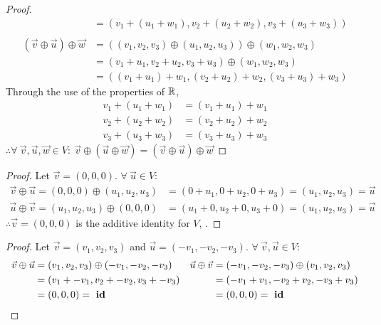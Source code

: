 \begin{enumerate}
\begin{proof}
\begin{align*}
                                              & = (v_1+(u_1+w_1),v_2+(u_2+w_2),v_3+(u_3+w_3))               \\ \\
      (\vec{v} \oplus \vec{u}) \oplus \vec{w} & = ((v_1,v_2,v_3) \oplus (u_1,u_2,u_3)) \oplus (w_1,w_2,w_3) \\
                                              & = (v_1+u_1,v_2+u_2,v_3+u_3) \oplus (w_1,w_2,w_3)            \\
                                              & = ((v_1+u_1)+w_1,(v_2+u_2)+w_2,(v_3+u_3)+w_3)
    \end{align*}
    Through the use of the properties of $\mathbb{R}$,
    \begin{align*}
      v_1+(u_1+w_1) & = (v_1+u_1)+w_1 \\
      v_2+(u_2+w_2) & = (v_2+u_2)+w_2 \\
      v_3+(u_3+w_3) & = (v_3+u_3)+w_3
    \end{align*}
    $\therefore \forall~\vec{v},\vec{u},\vec{w} \in V:~\vec{v} \oplus (\vec{u} \oplus \vec{w}) = (\vec{v} \oplus \vec{u}) \oplus \vec{w}$
  \end{proof}
  \begin{proof}
    Let $\vec{v} = (0,0,0)$. $\forall~\vec{u} \in V$:
    \begin{align*}
      \vec{v} \oplus \vec{u} = (0,0,0) \oplus (u_1,u_2,u_3) & = (0+u_1,0+u_2,0+u_3) = (u_1,u_2,u_3) = \vec{u} \\
      \vec{u} \oplus \vec{v} = (u_1,u_2,u_3) \oplus (0,0,0) & = (u_1+0,u_2+0,u_3+0) = (u_1,u_2,u_3) = \vec{u}
    \end{align*}
    $\therefore \vec{v} = (0,0,0)$ is the additive identity for $V$, .
  \end{proof}
  \begin{proof}
    Let $\vec{v} = (v_1,v_2,v_3)$ and $\vec{u} = (-v_1,-v_2,-v_3)$. $\forall~\vec{v},\vec{u} \in V$:
    \begin{align*}
      \vec{v} \oplus \vec{u} & = (v_1,v_2,v_3) \oplus (-v_1,-v_2,-v_3) & \vec{u} \oplus \vec{v} & = (-v_1,-v_2,-v_3) \oplus (v_1,v_2,v_3) \\
                             & = (v_1+-v_1,v_2+-v_2,v_3+-v_3)          &                        & = (-v_1+v_1,-v_2+v_2,-v_3+v_3)          \\
                             & = (0,0,0) =~\text{\textbf{id}}             &                        & = (0,0,0) =~\text{\textbf{id}}
    \end{align*}

\end{proof}
\end{enumerate}
